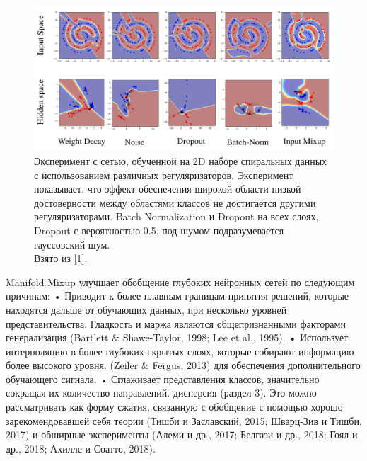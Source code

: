 \begin{figure}
    \centering
    \includegraphics[scale=0.25]{./images/mixup.png}
    \caption{\protect\hypertarget{image10}{Эксперимент с сетью, обученной на 2D наборе спиральных данных с использованием различных регуляризаторов. Эксперимент показывает, что эффект обеспечения широкой области низкой достоверности между областями классов не достигается другими регуляризаторами. Batch Normalization и Dropout на всех слоях, Dropout с вероятностью 0.5, под шумом подразумевается гауссовский шум.
 \\ Взято из \protect\hyperlink{cite.Ver18}{[1]}.}}
\end{figure}

Manifold Mixup улучшает обобщение глубоких нейронных сетей по следующим причинам:
• Приводит к более плавным границам принятия решений, которые находятся дальше от обучающих данных, при
несколько уровней представительства. Гладкость и маржа являются общепризнанными факторами
генерализация (Bartlett & Shawe-Taylor, 1998; Lee et al., 1995).
• Использует интерполяцию в более глубоких скрытых слоях, которые собирают информацию более высокого уровня.
(Zeiler & Fergus, 2013) для обеспечения дополнительного обучающего сигнала.
• Сглаживает представления классов, значительно сокращая их количество направлений.
дисперсия (раздел 3). Это можно рассматривать как форму сжатия, связанную с
обобщение с помощью хорошо зарекомендовавшей себя теории (Тишби и Заславский, 2015; Шварц-Зив и
Тишби, 2017) и обширные эксперименты (Алеми и др., 2017; Белгази и др., 2018;
Гоял и др., 2018; Ахилле и Соатто, 2018).

\newpage